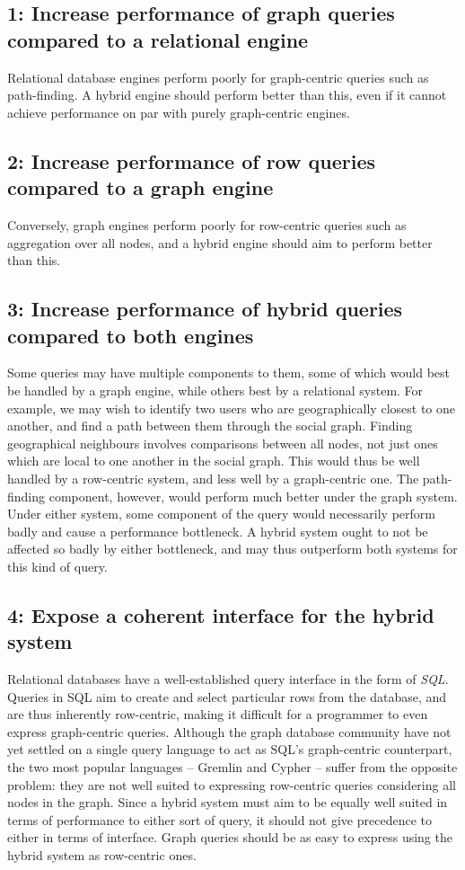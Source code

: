 \subsection*{1: Increase performance of graph queries compared to a relational engine}

Relational database engines perform poorly for graph-centric queries such as path-finding.
A hybrid engine should perform better than this, even if it cannot achieve performance on
par with purely graph-centric engines.

\subsection*{2: Increase performance of row queries compared to a graph engine}

Conversely, graph engines perform poorly for row-centric queries such as aggregation
over all nodes, and a hybrid engine should aim to perform better than this.

\subsection*{3: Increase performance of hybrid queries compared to both engines}

Some queries may have multiple components to them, some of which would best be
handled by a graph engine, while others best by a relational system. For
example, we may wish to identify two users who are geographically closest to
one another, and find a path between them through the social graph. Finding
geographical neighbours involves comparisons between all nodes, not just ones
which are local to one another in the social graph. This would thus be well
handled by a row-centric system, and less well by a graph-centric one. The
path-finding component, however, would perform much better under the graph
system. Under either system, some component of the query would necessarily
perform badly and cause a performance bottleneck. A hybrid system ought to not
be affected so badly by either bottleneck, and may thus outperform both systems
for this kind of query.

\subsection*{4: Expose a coherent interface for the hybrid system}

Relational databases have a well-established query interface in the form of
\textit{SQL}.  Queries in SQL aim to create and select particular rows from the
database, and are thus inherently row-centric, making it difficult for a
programmer to even express graph-centric queries. Although the graph database
community have not yet settled on a single query language to act as SQL's
graph-centric counterpart, the two most popular languages -- Gremlin and Cypher
-- suffer from the opposite problem: they are not well suited to expressing
row-centric queries considering all nodes in the graph. Since a hybrid system
must aim to be equally well suited in terms of performance to either sort of
query, it should not give precedence to either in terms of interface. Graph
queries should be as easy to express using the hybrid system as row-centric
ones.


